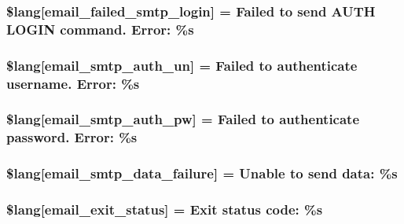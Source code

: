 \subsubsection[{\$lang}]{\setlength{\rightskip}{0pt plus 5cm}\$lang\mbox{[}\textquotesingle{}email\+\_\+failed\+\_\+smtp\+\_\+login\textquotesingle{}\mbox{]} = \textquotesingle{}Failed to send A\+U\+T\+H L\+O\+G\+I\+N command. Error\+: \%s\textquotesingle{}}\label{email__lang_8php_a791781c2fd1bd8ec87158be649519621}
\hypertarget{email__lang_8php_a69f2fa5072f039936748571ea5cc9cba}{}
\subsubsection[{\$lang}]{\setlength{\rightskip}{0pt plus 5cm}\$lang\mbox{[}\textquotesingle{}email\+\_\+smtp\+\_\+auth\+\_\+un\textquotesingle{}\mbox{]} = \textquotesingle{}Failed to authenticate username. Error\+: \%s\textquotesingle{}}\label{email__lang_8php_a69f2fa5072f039936748571ea5cc9cba}
\hypertarget{email__lang_8php_a09fd123f0d251a8eac845f985c6583c3}{}
\subsubsection[{\$lang}]{\setlength{\rightskip}{0pt plus 5cm}\$lang\mbox{[}\textquotesingle{}email\+\_\+smtp\+\_\+auth\+\_\+pw\textquotesingle{}\mbox{]} = \textquotesingle{}Failed to authenticate password. Error\+: \%s\textquotesingle{}}\label{email__lang_8php_a09fd123f0d251a8eac845f985c6583c3}
\hypertarget{email__lang_8php_a59801e23c2d745400384098c7bf0a6dc}{}
\subsubsection[{\$lang}]{\setlength{\rightskip}{0pt plus 5cm}\$lang\mbox{[}\textquotesingle{}email\+\_\+smtp\+\_\+data\+\_\+failure\textquotesingle{}\mbox{]} = \textquotesingle{}Unable to send data\+: \%s\textquotesingle{}}\label{email__lang_8php_a59801e23c2d745400384098c7bf0a6dc}
\hypertarget{email__lang_8php_a32b0c2f50acd03defc88df937ee2877f}{}
\subsubsection[{\$lang}]{\setlength{\rightskip}{0pt plus 5cm}\$lang\mbox{[}\textquotesingle{}email\+\_\+exit\+\_\+status\textquotesingle{}\mbox{]} = \textquotesingle{}Exit status code\+: \%s\textquotesingle{}}\label{email__lang_8php_a32b0c2f50acd03defc88df937ee2877f}
